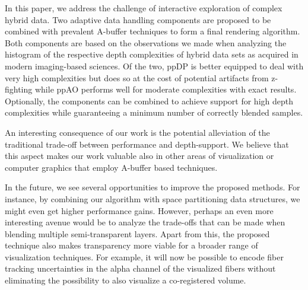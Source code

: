 \documentclass{egpubl}
\newcommand{\todo}[1]{{\color{red}\emph{(#1)}}}
\newcommand{\ab}{\mbox{A-buffer}}
\newcommand{\dch}{DCH}
\newcommand{\stencil}{ppAO}
\newcommand{\dloop}{ppDP}
\begin{document}
In this paper, we address the challenge of interactive exploration of complex hybrid data. 
Two adaptive data handling components are proposed to be combined with prevalent \ab{} techniques to form a final rendering algorithm. 
Both components are based on the observations we made when analyzing the histogram of the respective depth complexities of hybrid data sets as acquired in modern imaging-based sciences. 
Of the two, \dloop{} is better equipped to deal with very high complexities but does so at the cost of potential artifacts from z-fighting while \stencil{} performs well for moderate complexities with exact results. 
Optionally, the components can be combined to achieve support for high depth complexities while guaranteeing a minimum number of correctly blended samples. 

An interesting consequence of our work is the potential alleviation of the traditional trade-off between performance and depth-support. 
We believe that this aspect makes our work valuable also in other areas of visualization or computer graphics that employ \ab{} based techniques.

In the future, we see several opportunities to improve the proposed methods. 
For instance, by combining our algorithm with space partitioning data structures, we might even get higher performance gains. 
However, perhaps an even more interesting avenue would be to analyze the trade-offs that can be made when blending multiple semi-transparent layers. 
Apart from this, the proposed technique also makes transparency more viable for a broader range of visualization techniques. 
For example, it will now be possible to encode fiber tracking uncertainties in the alpha channel of the visualized fibers without eliminating the possibility to also visualize a co-registered volume. 

%
\end{document}
